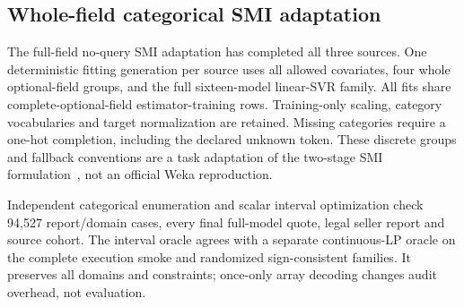 \subsection{Whole-field categorical SMI adaptation}
The full-field no-query SMI adaptation has completed all three sources.
One deterministic fitting generation per source uses all allowed covariates,
four whole optional-field groups, and the full sixteen-model linear-SVR
family. All fits share complete-optional-field estimator-training rows.
Training-only scaling, category vocabularies and target normalization are
retained. Missing categories require a one-hot completion, including the
declared unknown token. These discrete groups and fallback conventions
are a task adaptation of the two-stage SMI formulation~\cite{zhang2020strategic},
not an official Weka reproduction.

Independent categorical enumeration and scalar interval optimization check
94,527 report/domain cases, every final full-model quote, legal seller report
and source cohort. The interval oracle agrees with a separate continuous-LP
oracle on the complete execution smoke and randomized sign-consistent families.
It preserves all domains and constraints; once-only array decoding changes
audit overhead, not evaluation.


